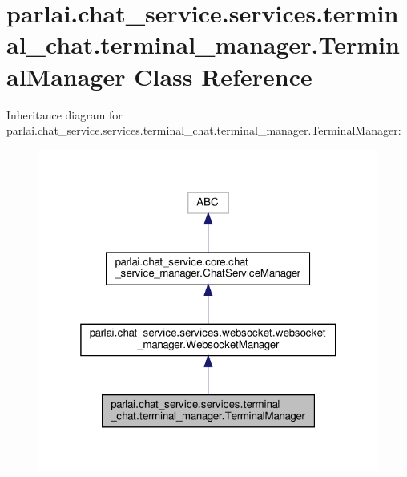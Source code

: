 \hypertarget{classparlai_1_1chat__service_1_1services_1_1terminal__chat_1_1terminal__manager_1_1TerminalManager}{}\section{parlai.\+chat\+\_\+service.\+services.\+terminal\+\_\+chat.\+terminal\+\_\+manager.\+Terminal\+Manager Class Reference}
\label{classparlai_1_1chat__service_1_1services_1_1terminal__chat_1_1terminal__manager_1_1TerminalManager}


Inheritance diagram for parlai.\+chat\+\_\+service.\+services.\+terminal\+\_\+chat.\+terminal\+\_\+manager.\+Terminal\+Manager\+:\nopagebreak
\begin{figure}[H]
\begin{center}
\leavevmode
\includegraphics[width=319pt]{dd/df9/classparlai_1_1chat__service_1_1services_1_1terminal__chat_1_1terminal__manager_1_1TerminalManager__inherit__graph}
\end{center}
\end{figure}


